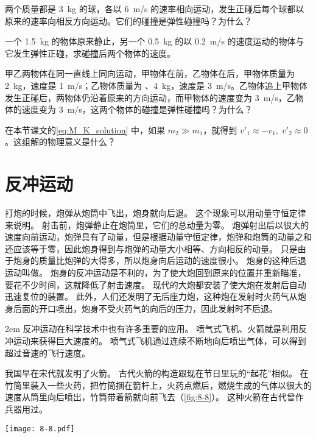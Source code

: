 \begin{Practice}
\begin{question}
\item 两个质量都是 \qty{3}{kg} 的球，各以 \qty{6}{m/s} 的速率相向运动，发生正碰后每个球都以原来的速率向相反方向运动。它们的碰撞是弹性碰撞吗？为什么？
\item 一个 \qty{1.5}{kg} 的物体原来静止，另一个 \qty{0.5}{kg} 的以 \qty{0.2}{m/s} 的速度运动的物体与它发生弹性正碰，求碰撞后两个物体的速度。
\item 甲乙两物体在同一直线上同向运动，甲物体在前，乙物体在后，甲物体质量为 \qty{2}{kg}，速度是 \qty{1}{m/s}；乙物体质量为 、\qty{4}{kg}，速度是 \qty{3}{m/s}。乙物体追上甲物体发生正碰后，两物体仍沿着原来的方向运动，而甲物体的速度变为 \qty{3}{m/s}，乙物体的速度变为 \qty{3}{m/s}，这两个物体的碰撞是弹性碰撞吗？为什么？
\item 在本节课文的\cref{eq:M_K_solution} 中，如果 $m_2\gg m_1$，就得到 $v'_1 \approx -v_1,\; v'_2\approx 0$。这组解的物理意义是什么？
\end{question}
\end{Practice}


\section{反冲运动}
打炮的时候，炮弹从炮筒中飞出，炮身就向后退。
这个现象可以用动量守恒定律来说明。
射击前，炮弹静止在炮筒里，它们的总动量为零。
炮弹射出后以很大的速度向前运动，炮弹具有了动量，但是根据动量守恒定律，炮弹和炮筒的动量之和还应该等于零，因此炮身得到与炮弹的动量大小相等、方向相反的动量。
只是由于炮身的质量比炮弹的大得多，所以炮身向后运动的速度很小。
炮身的这种后退运动叫做。
炮身的反冲运动是不利的，为了使大炮回到原来的位置并重新瞄准，要花不少时间，这就降低了射击速度。
现代的大炮都安装了使大炮在发射后自动迅速复位的装置。
此外，人们还发明了无后座力炮，这种炮在发射时火药气从炮身后面的开口喷出，炮身不受火药气的向后的压力，因此发射时不后退。

\medskip\noindent
\begin{minipage}{0.75\linewidth}\parindent2em
反冲运动在科学技术中也有许多重要的应用。
喷气式飞机、火箭就是利用反冲运动来获得巨大速度的。
喷气式飞机通过连续不断地向后喷出气体，可以得到超过音速的飞行速度。

我国早在宋代就发明了火箭。
古代火箭的构造跟现在节日里玩的“起花”相似。
在竹筒里装入一些火药，把竹筒捆在箭杆上，火药点燃后，燃烧生成的气体以很大的速度从筒里向后喷出，竹筒带着箭就向前飞去（\cref{fig:8-8}）。
这种火箭在古代曾作兵器用过。

\end{minipage}\hfill
\begin{minipage}{0.205\linewidth}
  \begin{figurehere}
    \texttt{[image: 8-8.pdf]}
    \caption{}\label{fig:8-8}
  \end{figurehere}
\end{minipage}

